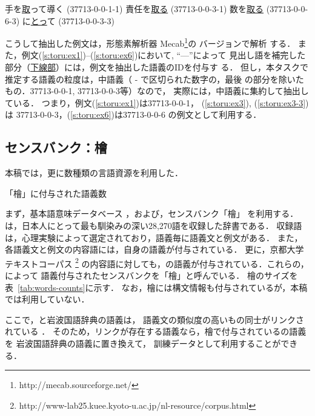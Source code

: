 \documentclass[japanese]{jnlp_1.4}
\newcommand{\unidic}{}
\newcommand{\lxd}{}
\begin{document}
\begin{exe}
\ex \label{s:toru:ex1}
手を\ul{取}って導く (37713-0-0-1-1)
\ex \label{s:toru:ex3}
責任を\ul{取る} (37713-0-0-3-1)
\ex \label{s:toru:ex6}
数を\ul{取る} (37713-0-0-6-3)
\ex \label{s:toru:ex3-3}
に\ul{とっ}て (37713-0-0-3-3)
\end{exe}


こうして抽出した例文は，形態素解析器
Mecab\footnote{http://mecab.sourceforge.net/}の \unidic{}バージョンで解析
する．
また，例文(\ref{s:toru:ex1})--(\ref{s:toru:ex6})において, ``—''によって
見出し語を補完した部分（\ul{下線部}）には，例文を抽出した語義のIDを付与す
る．
但し，本タスクで推定する語義の粒度は，中語義（ - で区切られた数字の，最後
の部分を除いたもの．37713-0-0-1, 37713-0-0-3等）なので，
実際には，中語義に集約して抽出している．
つまり，例文(\ref{s:toru:ex1})は37713-0-0-1，
(\ref{s:toru:ex3}), (\ref{s:toru:ex3-3})は
37713-0-0-3，(\ref{s:toru:ex6})は37713-0-0-6 の例文として利用する．


\subsection{センスバンク：檜} 
\label{sec:hinoki}


本稿では，更に数種類の言語資源を利用した．

\begin{table}[b]
\caption{「檜」に付与された語義数}
\label{tab:words-counts}

\end{table}

まず，基本語意味データベース\lxd
\cite{Lexeed:2004j}，および，センスバンク「檜」
\cite{Bond:Fujita:Tanaka:2006}を利用する．
\lxd{}は，日本人にとって最も馴染みの深い28,270語を収録した辞書である．
収録語は，心理実験によって選定されており，語義毎に語義文と例文がある．
また，各語義文と例文の内容語には，\lxd{}自身の語義が付与されている．
更に，京都大学テキストコーパス
\footnote{http://www-lab25.kuee.kyoto-u.ac.jp/nl-resource/corpus.html}
の内容語に対しても，\lxd{}の語義が付与されている．これらの，\lxd{}によって
語義付与されたセンスバンクを「檜」\cite{Bond:Fujita:Tanaka:2006}と呼んでいる．
檜のサイズを表~\ref{tab:words-counts}に示す．
なお，檜には構文情報も付与されているが，本稿では利用していない．


ここで，\lxd{}と岩波国語辞典の語義は，
語義文の類似度の高いもの同士がリンクされている
\cite{Dridan:Bond:2006}．
そのため，リンクが存在する語義なら，檜で付与されている\lxd{}の語義を
岩波国語辞典の語義に置き換えて，
訓練データとして利用することができる．
\end{document}
